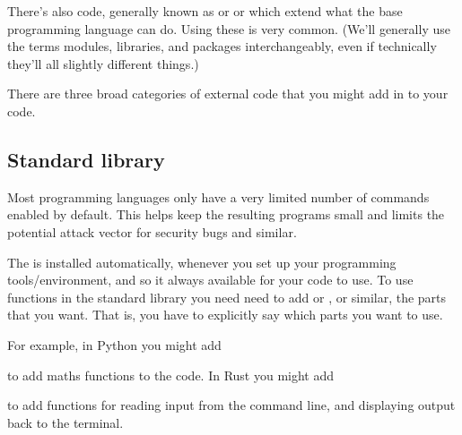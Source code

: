 \documentclass[letterpaper,10pt,british]{sphinxmanual}
\begin{document}
\sphinxAtStartPar
There’s also code, generally known as  or  or  which extend what the base programming language can do. Using these is very common. (We’ll generally use the terms modules, libraries, and packages inter\sphinxhyphen{}changeably, even if technically they’ll all slightly different things.)

\sphinxAtStartPar
There are three broad categories of external code that you might add in to your code.


\subsection{Standard library}
\label{\detokenize{chapters/software_development_tools/libraries:standard-library}}\label{\detokenize{chapters/software_development_tools/libraries:id1}}
\sphinxAtStartPar
Most programming languages only have a very limited number of commands enabled by default. This helps keep the resulting programs small and limits the potential attack vector for security bugs and similar.

\sphinxAtStartPar
The  is installed automatically, whenever you set up your programming tools/environment, and so it always available for your code to use. To use functions in the standard library you need need to add  or , or similar, the parts that you want. That is, you have to explicitly say which parts you want to use.

\sphinxAtStartPar
For example, in Python you might add

\begin{sphinxVerbatim}[commandchars=\\\{\}]
\end{sphinxVerbatim}

\sphinxAtStartPar
to add maths functions to the code. In Rust you might add

\begin{sphinxVerbatim}[commandchars=\\\{\}]
 
\end{sphinxVerbatim}

\sphinxAtStartPar
to add functions for reading input from the command line, and displaying output back to the terminal.
\end{document}
